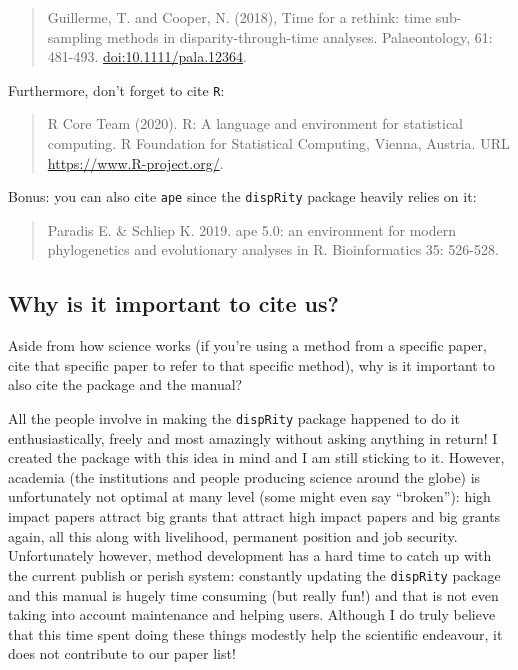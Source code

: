 \documentclass[]{book}
\begin{document}
\begin{quote}
Guillerme, T. and Cooper, N. (2018), Time for a rethink: time sub-sampling methods in disparity-through-time analyses. Palaeontology, 61: 481-493. \href{https://onlinelibrary.wiley.com/doi/abs/10.1111/pala.12364}{doi:10.1111/pala.12364}.
\end{quote}

Furthermore, don't forget to cite \texttt{R}:

\begin{quote}
R Core Team (2020). R: A language and environment for statistical computing. R Foundation for Statistical Computing, Vienna, Austria. URL \url{https://www.R-project.org/}.
\end{quote}

Bonus: you can also cite \texttt{ape} since the \texttt{dispRity} package heavily relies on it:

\begin{quote}
Paradis E. \& Schliep K. 2019. ape 5.0: an environment for modern phylogenetics and evolutionary analyses in R. Bioinformatics 35: 526-528.
\end{quote}

\hypertarget{why-is-it-important-to-cite-us}{%
\subsection{Why is it important to cite us?}\label{why-is-it-important-to-cite-us}}

Aside from how science works (if you're using a method from a specific paper, cite that specific paper to refer to that specific method), why is it important to also cite the package and the manual?

All the people involve in making the \texttt{dispRity} package happened to do it enthusiastically, freely and most amazingly without asking anything in return!
I created the package with this idea in mind and I am still sticking to it.
However, academia (the institutions and people producing science around the globe) is unfortunately not optimal at many level (some might even say ``broken''): high impact papers attract big grants that attract high impact papers and big grants again, all this along with livelihood, permanent position and job security.
Unfortunately however, method development has a hard time to catch up with the current publish or perish system: constantly updating the \texttt{dispRity} package and this manual is hugely time consuming (but really fun!) and that is not even taking into account maintenance and helping users.
Although I do truly believe that this time spent doing these things modestly help the scientific endeavour, it does not contribute to our paper list!
\end{document}
